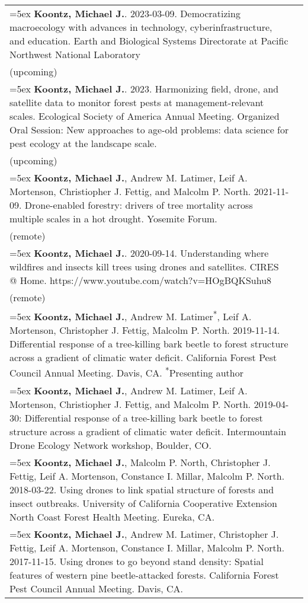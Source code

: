 \begin{longtable}{@{}>{\raggedright}p{5.25in} @{} >{\raggedleft}X@{}}

\hangindent=5ex \textbf{Koontz, Michael J.}. 2023-03-09. Democratizing macroecology with advances in technology, cyberinfrastructure, and education. Earth and Biological Systems Directorate at Pacific Northwest National Laboratory & 2023 \\ (upcoming)  \tabularnewline

\hangindent=5ex \textbf{Koontz, Michael J.}. 2023. Harmonizing field, drone, and satellite data to monitor forest pests at management-relevant scales. Ecological Society of America Annual Meeting. Organized Oral Session: New approaches to age-old problems: data science for pest ecology at the landscape scale. & 2023 \\ (upcoming)  \tabularnewline

\hangindent=5ex \textbf{Koontz, Michael J.}, Andrew M. Latimer, Leif A. Mortenson, Christiopher J. Fettig, and Malcolm P. North. 2021-11-09. Drone-enabled forestry: drivers of tree mortality across multiple scales in a hot drought. Yosemite Forum. & 2021 \\ (remote) \tabularnewline

\hangindent=5ex \textbf{Koontz, Michael J.}. 2020-09-14. Understanding where wildfires and insects kill trees using drones and satellites. CIRES @ Home. https://www.youtube.com/watch?v=HOgBQKSuhu8 & 2020 \\ (remote) \tabularnewline

\hangindent=5ex \textbf{Koontz, Michael J.}, Andrew M. Latimer\textsuperscript{*}, Leif A. Mortenson, Christopher J. Fettig, Malcolm P. North. 2019-11-14. Differential response of a tree-killing bark beetle to forest structure across a gradient of climatic water deficit. California Forest Pest Council Annual Meeting. Davis, CA. \newline \textsuperscript{*}Presenting author & 2019 \tabularnewline

\hangindent=5ex \textbf{Koontz, Michael J.}, Andrew M. Latimer, Leif A. Mortenson, Christiopher J. Fettig, and Malcolm P. North. 2019-04-30: Differential response of a tree-killing bark beetle to forest structure across a gradient of climatic water deficit. Intermountain Drone Ecology Network workshop, Boulder, CO. & 2019 \tabularnewline

\hangindent=5ex \textbf{Koontz, Michael J.}, Malcolm P. North, Christopher J. Fettig, Leif A. Mortenson, Constance I. Millar, Malcolm P. North. 2018-03-22. Using drones to link spatial structure of forests and insect outbreaks. University of California Cooperative Extension North Coast Forest Health Meeting. Eureka, CA. & 2018 \tabularnewline

\hangindent=5ex \textbf{Koontz, Michael J.}, Andrew M. Latimer, Christopher J. Fettig, Leif A. Mortenson, Constance I. Millar, Malcolm P. North. 2017-11-15. Using drones to go beyond stand density: Spatial features of western pine beetle-attacked forests. California Forest Pest Council Annual Meeting. Davis, CA. & 2017

\end{longtable}
